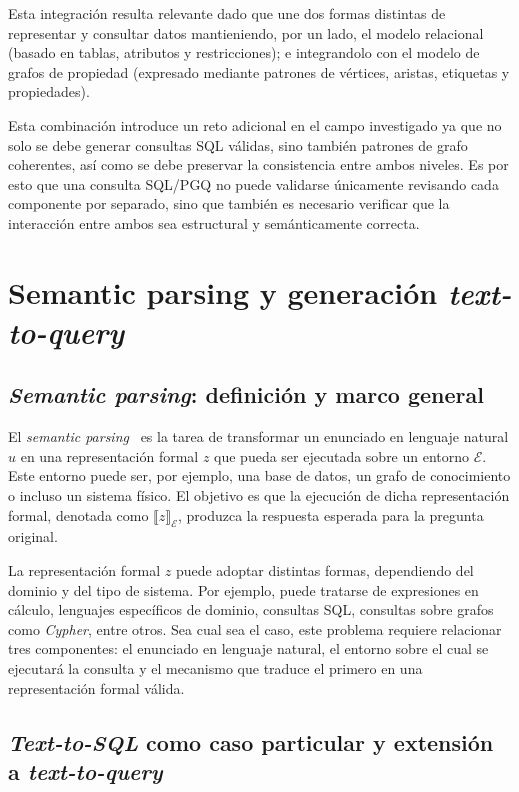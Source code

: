 Esta integración resulta relevante dado que une dos formas distintas de representar y consultar datos mantieniendo, por un lado, el modelo relacional (basado en tablas, atributos y restricciones); e integrandolo con el modelo de grafos de propiedad (expresado mediante patrones de vértices, aristas, etiquetas y propiedades).

Esta combinación introduce un reto adicional en el campo investigado ya que no solo se debe generar consultas SQL válidas, sino también patrones de grafo coherentes, así como se debe preservar la consistencia entre ambos niveles. Es por esto que una consulta SQL/PGQ no puede validarse únicamente revisando cada componente por separado, sino que también es necesario verificar que la interacción entre ambos sea estructural y semánticamente correcta.

\section{Semantic parsing y generación \emph{text-to-query}}
\label{sec:semantic-parsing}

\subsection{\emph{Semantic parsing}: definición y marco general}

El \emph{semantic parsing}~\cite{ZelleMooney1996} es la tarea de transformar un enunciado en lenguaje natural $u$ en una representación formal $z$ que pueda ser ejecutada sobre un entorno $\mathcal{E}$. Este entorno puede ser, por ejemplo, una base de datos, un grafo de conocimiento o incluso un sistema físico. El objetivo es que la ejecución de dicha representación formal, denotada como $\llbracket z \rrbracket_{\mathcal{E}}$, produzca la respuesta esperada para la pregunta original.

La representación formal $z$ puede adoptar distintas formas, dependiendo del dominio y del tipo de sistema. Por ejemplo, puede tratarse de expresiones en cálculo, lenguajes específicos de dominio, consultas SQL, consultas sobre grafos como \emph{Cypher}, entre otros. Sea cual sea el caso, este problema requiere relacionar tres componentes: el enunciado en lenguaje natural, el entorno sobre el cual se ejecutará la consulta y el mecanismo que traduce el primero en una representación formal válida.

\subsection{\emph{Text-to-SQL} como caso particular y extensión a \emph{text-to-query}}

